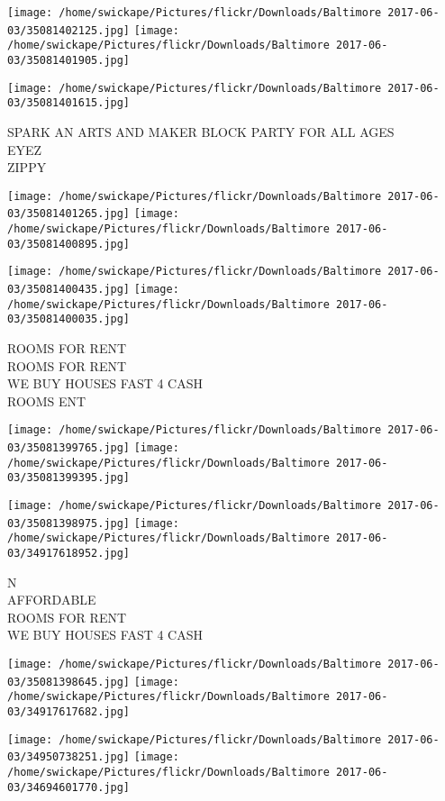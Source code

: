 \documentclass[10pt,letterpaper]{article}
\begin{document}
\texttt{[image: /home/swickape/Pictures/flickr/Downloads/Baltimore 2017-06-03/35081402125.jpg]}
\texttt{[image: /home/swickape/Pictures/flickr/Downloads/Baltimore 2017-06-03/35081401905.jpg]}

\vspace{0.25in}
\texttt{[image: /home/swickape/Pictures/flickr/Downloads/Baltimore 2017-06-03/35081401615.jpg]}

SPARK AN ARTS AND MAKER BLOCK PARTY FOR ALL AGES\\
EYEZ\\
ZIPPY
\pagebreak

\texttt{[image: /home/swickape/Pictures/flickr/Downloads/Baltimore 2017-06-03/35081401265.jpg]}
\texttt{[image: /home/swickape/Pictures/flickr/Downloads/Baltimore 2017-06-03/35081400895.jpg]}

\texttt{[image: /home/swickape/Pictures/flickr/Downloads/Baltimore 2017-06-03/35081400435.jpg]}
\texttt{[image: /home/swickape/Pictures/flickr/Downloads/Baltimore 2017-06-03/35081400035.jpg]}

ROOMS FOR RENT\\
ROOMS FOR RENT\\
WE BUY HOUSES FAST 4 CASH\\
ROOMS ENT
\pagebreak

\texttt{[image: /home/swickape/Pictures/flickr/Downloads/Baltimore 2017-06-03/35081399765.jpg]}
\texttt{[image: /home/swickape/Pictures/flickr/Downloads/Baltimore 2017-06-03/35081399395.jpg]}

\texttt{[image: /home/swickape/Pictures/flickr/Downloads/Baltimore 2017-06-03/35081398975.jpg]}
\texttt{[image: /home/swickape/Pictures/flickr/Downloads/Baltimore 2017-06-03/34917618952.jpg]}

N\\
AFFORDABLE\\
ROOMS FOR RENT\\
WE BUY HOUSES FAST 4 CASH
\pagebreak

\texttt{[image: /home/swickape/Pictures/flickr/Downloads/Baltimore 2017-06-03/35081398645.jpg]}
\texttt{[image: /home/swickape/Pictures/flickr/Downloads/Baltimore 2017-06-03/34917617682.jpg]}

\texttt{[image: /home/swickape/Pictures/flickr/Downloads/Baltimore 2017-06-03/34950738251.jpg]}
\texttt{[image: /home/swickape/Pictures/flickr/Downloads/Baltimore 2017-06-03/34694601770.jpg]}
\end{document}
